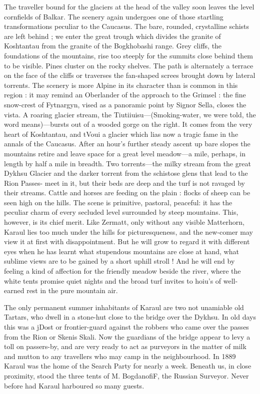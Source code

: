 \documentclass[25pt, a4paper]{article}
\begin{document}
	The traveller bound for the glaciers at the head of the valley soon leaves the level cornfields of Balkar. The scenery again undergoes one of those startling transformations peculiar to the Caucasus. The bare, rounded, crystalline schists are left behind ; we enter the great trough which divides the granite of Koshtantau from the granite of the Bogkhobashi range. Grey cliffs, the foundations of the mountains, rise too steeply for the summits close behind them to be visible. Pines cluster on the rocky shelves. The path is alternately a terrace on the face of the cliffs or traverses the fan-shaped screes brought down by lateral torrents. The scenery is more Alpine in its character than is common in this region : it may remind an Oberlander of the approach to the Grimsel : the fine snow-crest of Fytnargyn, vised as a panoramic point by Signor Sella, closes the vista. A roaring glacier stream, the Tiutiiuisu—(Smoking-water, we were told, the word means)—bursts out of a wooded gorge on the right. It comes from the very heart of Koshtantau, and tVoui a glacier which lias now a tragic fame in the annals of the Caucasus. After an hour's further steady ascent up bare slopes the mountains retire and leave space for a great level meadow—a mile, perhaps, in length by half a mile in breadth. Two torrents—the milky stream from the great Dykhsu Glacier and the darker torrent from the schistose glens that lead to the Rion Passes- meet in it, but their beds are deep and the turf is not ravaged by their streams. Cattle and horses are feeding on the plain : flocks of sheep can be seen high on the hills. The scene is primitive, pastoral, peaceful: it has the peculiar charm of every secluded level surrounded by steep mountains. This, however, is its chief merit. Like Zermatt, only without any visible Matterhorn, Karaul lies too much under the hills for picturesqueness, and the new-comer may view it at first with disappointment. But he will grow to regard it with different eyes when he has learnt what stupendous mountains are close at hand, what sublime views are to be gained by a short uphill stroll ! And he will end by feeling a kind of affection for the friendly meadow beside the river, where the white tents promise quiet nights and the broad turf invites to hoiu's of well-earned rest in the pure mountain air. 
	
	The only permanent summer inhabitants of Karaul are two not unamiable old Tartars, who dwell in a stone-hut close to the bridge over the Dykhsu. In old days this was a jDost or frontier-guard against the robbers who came over the passes from the Rion or Skenis Skali. Now the guardians of the bridge appear to levy a toll on passers-by, and are very ready to act as purveyors in the matter of milk and mutton to any travellers who may camp in the neighbourhood. In 1889 Karaul was the home of the Search Party for nearly a week. Beneath us, in close proximity, stood the three tents of M. BogdanofiF, the Russian Surveyor. Never before had Karaul harboured so many guests. 
	
\end{document}
